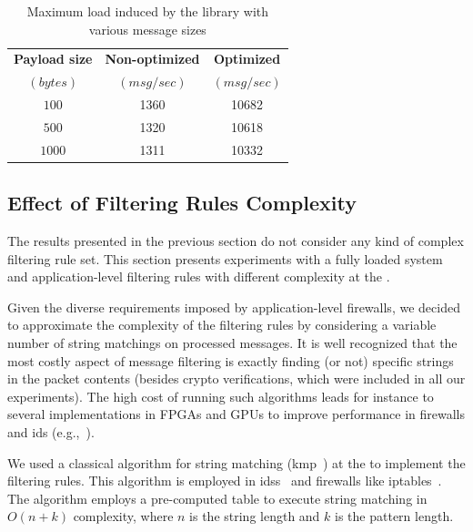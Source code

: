 \begin{table}[t!]
\begin{tabular}{ccc}\hline\hline
\textbf{Payload size } & \textbf{Non-optimized}  & \textbf{Optimized}   \\
\textbf{$(bytes)$} & \textbf{$(msg/sec)$} & \textbf{$(msg/sec)$}  \\\hline
$100  $ & 1360 & 10682 \\
$500  $ & 1320 & 10618 \\
$1000 $ & 1311 & 10332  \\
\hline\hline
\end{tabular}
\caption{\small Maximum load induced by the \sender library with various message sizes\label{tab:client_evaluation}}
\end{table}

\subsection{Effect of Filtering Rules Complexity}

The results presented in the previous section do not consider any kind of complex filtering rule set.
This section presents experiments with a fully loaded system and application-level filtering rules with different complexity at the \repsieves.

Given the diverse requirements imposed by application-level firewalls, we decided to approximate the complexity of the filtering rules by considering a variable number of string matchings on processed messages.  It is well recognized that the most costly aspect of message filtering is exactly finding (or not) specific strings in the packet contents (besides crypto verifications, which were included in all our experiments). 
The high cost of running such algorithms leads for instance to several implementations in FPGAs and GPUs to improve performance in firewalls and \gls{ids} (e.g.,~\cite{Moscola:2003,Lee:2015}).

We used a classical algorithm for string matching (\gls{kmp}~\cite{Knuth:1977}) at the \repsieves to implement the filtering rules.
This algorithm is employed in \glspl{ids}~\cite{Prabha:2014} and firewalls like iptables~\cite{iptables}.
The algorithm employs a pre-computed table to execute string matching in $O(n + k)$ complexity, where $n$ is the string length and $k$ is the pattern length.


